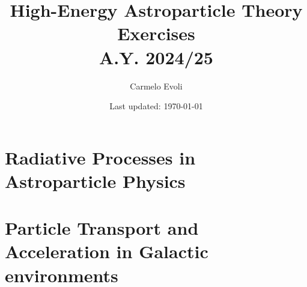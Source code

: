 \documentclass[letterpaper, 11pt, notitlepage]{report}
\begin{document}
\title{High-Energy Astroparticle Theory \\ {\color{blue}Exercises} \\[1em]
\normalsize A.Y. 2024/25}

\author{\normalsize Carmelo Evoli}
\date{\normalsize\vspace{-1ex} Last updated: \today}

\maketitle

\tableofcontents\label{sec:contents}

\newpage

\chapter{Radiative Processes in Astroparticle Physics} 








\chapter{Particle Transport and Acceleration in Galactic environments}






%

%
%



\end{document}
